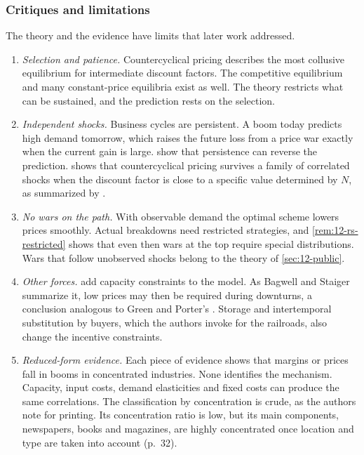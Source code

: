 \subsubsection{Critiques and limitations}

The theory and the evidence have limits that later work addressed.
\begin{enumerate}[label=(\arabic*)]
\item \emph{Selection and patience.} Countercyclical pricing describes the most collusive equilibrium for intermediate
discount factors. The competitive equilibrium and many constant-price equilibria exist as well. The theory restricts
what can be sustained, and the prediction rests on the selection.
\item \emph{Independent shocks.} Business cycles are persistent. A boom today predicts high demand tomorrow, which
raises the future loss from a price war exactly when the current gain is large.  show
that persistence can reverse the prediction. \citet{Kandori1991} shows that countercyclical pricing survives a family
of correlated shocks when the discount factor is close to a specific value determined by $N$, as summarized by
\citet[p.~2]{BagwellStaiger1995}.
\item \emph{No wars on the path.} With observable demand the optimal scheme lowers prices smoothly. Actual breakdowns
need restricted strategies, and \cref{rem:12-rs-restricted} shows that even then wars at the top require special
distributions. Wars that follow unobserved shocks belong to the theory of \cref{sec:12-public}.
\item \emph{Other forces.} \citet{StaigerWolak1992} add capacity constraints to the model. As Bagwell and Staiger
summarize it, low prices may then be required during downturns, a conclusion analogous to Green and Porter's
\citep[fn.~1]{BagwellStaiger1995}. Storage and intertemporal substitution by buyers, which the authors invoke for the
railroads, also change the incentive constraints.
\item \emph{Reduced-form evidence.} Each piece of evidence shows that margins or prices fall in booms in concentrated
industries. None identifies the mechanism. Capacity, input costs, demand elasticities and fixed costs can produce the
same correlations. The classification by concentration is crude, as the authors note for printing. Its concentration
ratio is low, but its main components, newspapers, books and magazines, are highly concentrated once location and
type are taken into account (p.~32).
\end{enumerate}

